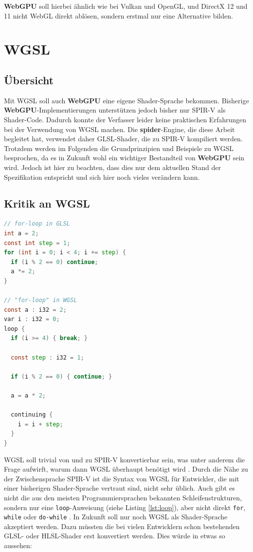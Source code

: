 \documentclass[oneside]{ausarbeitung}
\newcommand*{\quotize}[1]{\glqq #1\grqq}
\begin{document}
\textbf{WebGPU} soll hierbei ähnlich wie bei Vulkan und OpenGL, und DirectX 12 und 11 nicht WebGL direkt ablösen, sondern erstmal nur eine Alternative bilden.

\section{WGSL}
\subsection{Übersicht}
Mit WGSL \cite{w3:wgsl} soll auch \textbf{WebGPU} eine eigene Shader-Sprache bekommen. Bisherige \textbf{WebGPU}-Implementierungen unterstützen jedoch bisher nur SPIR-V als Shader-Code. Dadurch konnte der Verfasser leider keine praktischen Erfahrungen bei der Verwendung von WGSL machen. Die \textbf{spider}-Engine, die diese Arbeit begleitet hat, verwendet daher GLSL-Shader, die zu SPIR-V kompiliert werden. Trotzdem werden im Folgenden die Grundprinzipien und Beispiele zu WGSL besprochen, da es in Zukunft wohl ein wichtiger Bestandteil von \textbf{WebGPU} sein wird. Jedoch ist hier zu beachten, dass dies nur dem aktuellen Stand der Spezifikation entspricht und sich hier noch vieles verändern kann.

\subsection{Kritik an WGSL}
\begin{minipage}{\textwidth}
\begin{lstlisting}[language=GLSL, label={lst:loop}, caption={for-Schleifen in GLSL und WGSL}]
// for-loop in GLSL
int a = 2;
const int step = 1;
for (int i = 0; i < 4; i += step) {
  if (i % 2 == 0) continue;
  a *= 2;
}

// "for-loop" in WGSL
const a : i32 = 2;
var i : i32 = 0;
loop {
  if (i >= 4) { break; }

  const step : i32 = 1;

  if (i % 2 == 0) { continue; }

  a = a * 2;

  continuing {
    i = i + step;
  }
}
\end{lstlisting}
\end{minipage}

WGSL soll \quotize{trivial von und zu SPIR-V konvertierbar} \cite[Vgl.][Goals]{w3:wgsl} sein, was unter anderem die Frage aufwirft, warum dann WGSL überhaupt benötigt wird \cite[Vgl.][]{github:wgsl_terrible}. Durch die Nähe zu der Zwischensprache SPIR-V ist die Syntax von WGSL für Entwickler, die mit einer bisherigen Shader-Sprache vertraut sind, nicht sehr üblich. Auch gibt es nicht die aus den meisten Programmiersprachen bekannten Schleifenstrukturen, sondern nur eine \texttt{loop}-Anweisung (siehe Listing \ref{lst:loop}), aber nicht direkt \texttt{for}, \texttt{while} oder \texttt{do-while} \cite[Vgl.][]{github:wgsl_loop}. In Zukunft soll nur noch WGSL als Shader-Sprache akzeptiert werden. Dazu müssten die bei vielen Entwicklern schon bestehenden GLSL- oder HLSL-Shader erst konvertiert werden. Dies würde in etwas so aussehen:
\end{document}
